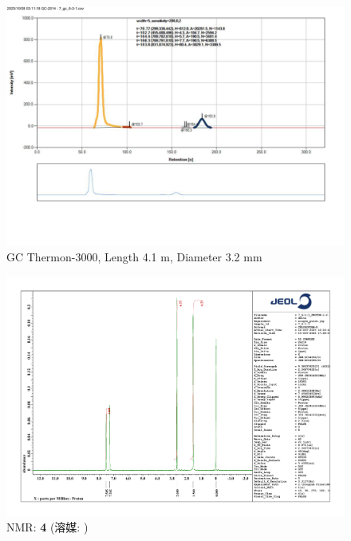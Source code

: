 \documentclass{ltjsarticle}
\theoremstyle{definition}
\numberwithin{equation}{section}
\begin{document}
\begin{figure}[htbp]
\begin{center}
\includegraphics[width = 15 cm]{GC_6-2-1.pdf}
\caption{GC Thermon-3000, Length 4.1 m, Diameter 3.2 mm}
\label{GC_6-2}
\end{center}
\end{figure}


\begin{figure}[htbp]
\begin{center}
\includegraphics[width = 15 cm]{NMR_6-1-3.pdf}
\caption{NMR: \textbf{4} (溶媒: )}
\label{NMR_6-1-3}
\end{center}
\end{figure}
\end{document}
